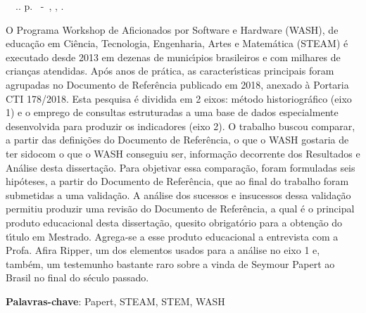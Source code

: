 \setlength{\absparsep}{18pt} %
\begin{resumo}
\begin{flushleft} 
\setlength{\absparsep}{0pt} %
\SingleSpacing 
\imprimirautorabr~~\textbf{\imprimirtituloresumo}.\imprimirdata. \pageref{LastPage}p. 
\imprimirtipotrabalho~-~\imprimirinstituicao, \imprimirlocal, \imprimirdata. 
 \end{flushleft}
\OnehalfSpacing 
O  Programa Workshop de Aficionados por Software e Hardware (WASH), de educa\c{c}\~ao em Ci\^encia, Tecnologia, Engenharia, Artes e Matem\'atica (STEAM) \'e executado desde 2013 em dezenas de munic\'{\i}pios brasileiros e com milhares de crian\c{c}as atendidas. Ap\'os anos de pr\'atica, as caracter\'{\i}sticas principais foram agrupadas no Documento de Refer\^encia publicado em 2018, anexado \`a Portaria CTI 178/2018. Esta pesquisa \'e dividida em 2 eixos: m\'etodo historiogr\'afico (eixo 1) e o emprego de consultas estruturadas a uma base de dados especialmente desenvolvida para produzir os indicadores (eixo 2). O trabalho buscou comparar, a partir das defini\c{c}\~oes do Documento de Refer\^encia, \textquotedbl o que o WASH gostaria de ter sido\textquotedbl  com \textquotedbl o que o WASH conseguiu ser\textquotedbl , informa\c{c}\~ao decorrente dos Resultados e An\'alise desta disserta\c{c}\~ao. Para objetivar essa compara\c{c}\~ao, foram formuladas seis hip\'oteses, a partir do Documento de Refer\^encia, que ao final do trabalho foram submetidas a uma valida\c{c}\~ao.  A an\'alise dos sucessos e insucessos dessa valida\c{c}\~ao permitiu produzir uma revis\~ao do Documento de Refer\^encia, a qual \'e o principal produto educacional desta disserta\c{c}\~ao, quesito obrigat\'orio para a obten\c{c}\~ao do t\'{\i}tulo em Mestrado. Agrega-se a esse produto educacional a entrevista com a Profa. Afira Ripper, um dos elementos usados para a an\'alise no eixo 1 e, tamb\'em, um testemunho bastante raro sobre a vinda de Seymour Papert ao Brasil no final do s\'eculo passado.
 

 \textbf{Palavras-chave}: Papert, STEAM, STEM, WASH
\end{resumo}